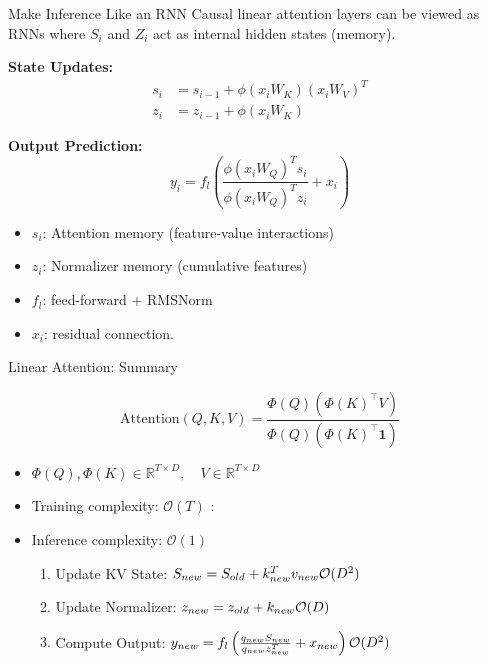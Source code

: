 \documentclass[aspectratio=169]{beamer}
\theoremstyle{definition}
\begin{document}
\begin{frame}{Make Inference Like an RNN}
Causal linear attention layers can be viewed as RNNs where $S_i$ and $Z_i$ act as internal hidden states (memory).

\textbf{State Updates:}
\begin{align}
    s_i &= s_{i-1} + \phi(x_i W_K) (x_i W_V)^T \\
    z_i &= z_{i-1} + \phi(x_i W_K)
\end{align}

\textbf{Output Prediction:}
\begin{equation}
    y_i = f_l \left( \frac{\phi(x_i W_Q)^T s_i}{\phi(x_i W_Q)^T z_i} + x_i \right)
\end{equation}

\begin{itemize}
    \item $s_i$: Attention memory (feature-value interactions)
    \item $z_i$: Normalizer memory (cumulative features)
    \item $f_l$: feed-forward + RMSNorm 
    \item $x_i$: residual connection.
\end{itemize}
\end{frame}



\begin{frame}{Linear Attention: Summary}

\begin{equation}
\text{Attention}(Q, K, V) = \frac{\Phi(Q) \left( \Phi(K)^\top V \right)}{\Phi(Q) \left( \Phi(K)^\top \mathbf{1} \right)}
\end{equation}

\vspace{0.5em}

\begin{itemize}
    \item $\Phi(Q), \Phi(K) \in \mathbb{R}^{T \times D}, \quad V \in \mathbb{R}^{T \times D}$

    \vspace{0.5em}
    
    \item Training complexity: $\mathcal{O}(T)$ :

    \vspace{0.5em}
    \item Inference complexity: $\mathcal{O}(1)$
    \begin{enumerate}
        \item Update KV State: $S_{new} = S_{old} + k_{new}^T v_{new} \hfill \mathcal{O}(D^2)$
        \item Update Normalizer: $z_{new} = z_{old} + k_{new} \hfill \mathcal{O}(D)$
        \item Compute Output: $y_{new} = f_l \left( \frac{q_{new} S_{new}}{q_{new} z_{new}^T} + x_{new} \right) \hfill \mathcal{O}(D^2)$
    \end{enumerate}
\end{itemize}

\end{frame}
\end{document}
